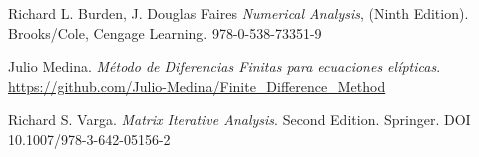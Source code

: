 \documentclass[a4paper]{article}
\begin{document}
\begin{thebibliography}{99}


 Richard L. Burden, J. Douglas Faires \textit{Numerical Analysis}, (Ninth Edition). Brooks/Cole, Cengage Learning. 978-0-538-73351-9

 Julio Medina. \textit{Método de Diferencias Finitas para ecuaciones elípticas}. \url{https://github.com/Julio-Medina/Finite_Difference_Method}

 Richard S. Varga. \textit{Matrix Iterative Analysis}. Second Edition. Springer. DOI 10.1007/978-3-642-05156-2






\end{thebibliography}
\end{document}

